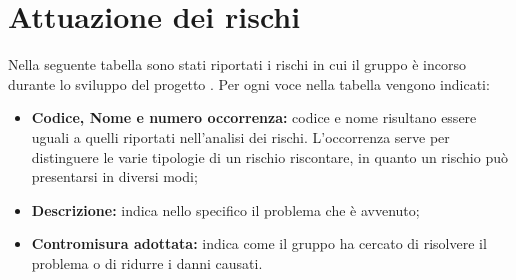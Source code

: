 \section{Attuazione dei rischi}

Nella seguente tabella sono stati riportati i rischi in cui il gruppo \Omicron{} è incorso durante lo sviluppo del progetto \nameproject{}.
Per ogni voce nella tabella vengono indicati:
\begin{itemize}
\item \textbf{Codice, Nome e numero occorrenza:} codice e nome risultano essere uguali a quelli riportati nell'analisi dei rischi. L'occorrenza serve per distinguere le varie tipologie di un rischio riscontare, in quanto un rischio può presentarsi in diversi modi;
\item \textbf{Descrizione:} indica nello specifico il problema che è avvenuto;
\item \textbf{Contromisura adottata:} indica come il gruppo ha cercato di risolvere il problema o di ridurre i danni causati.
\end{itemize}

